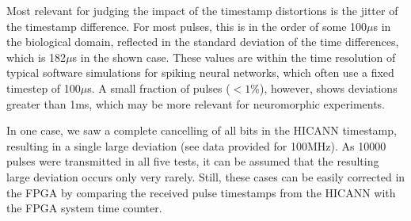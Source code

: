 \documentclass{article}
\begin{document}
Most relevant for judging the impact of the timestamp distortions is the jitter of the timestamp difference.
For most pulses, this is in the order of some 100$\mu$s in the biological domain, reflected in the standard deviation of the time differences, which is 182$\mu$s in the shown case.
These values are within the time resolution of typical software simulations for spiking neural networks, which often use a fixed timestep of 100$\mu$s.
A small fraction of pulses ($<1$\%), however, shows deviations greater than 1ms, which may be more relevant for neuromorphic experiments.

In one case, we saw a complete cancelling of all bits in the HICANN timestamp, resulting in a single large deviation (see data provided for 100MHz).
As 10000 pulses were transmitted in all five tests, it can be assumed that the resulting large deviation occurs only very rarely.
Still, these cases can be easily corrected in the FPGA by comparing the received pulse timestamps from the HICANN with the FPGA system time counter. 
\end{document}
